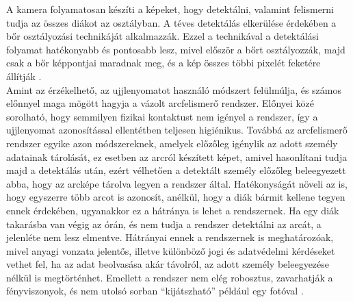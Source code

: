 \documentclass[12pt]{article}
\numberwithin{figure}{section}
\numberwithin{equation}{section}
\begin{document}
A kamera folyamatosan készíti a képeket, hogy detektálni, valamint felismerni tudja az összes diákot az osztályban. A téves detektálás elkerülése érdekében a bőr osztályozási technikáját alkalmazzák. Ezzel a technikával a detektálási folyamat hatékonyabb és pontosabb lesz, mivel először a bőrt osztályozzák, majd csak a bőr képpontjai maradnak meg, és a kép összes többi pixelét feketére állítják \cite{7}. \\
Amint az érzékelhető, az ujjlenyomatot használó módszert felülmúlja, és számos előnnyel maga mögött hagyja a vázolt arcfelismerő rendszer. Előnyei közé sorolható, hogy semmilyen fizikai kontaktust nem igényel a rendszer, így a ujjlenyomat azonosítással ellentétben teljesen higiénikus. Továbbá az arcfelismerő rendszer egyike azon módszereknek, amelyek előzőleg igénylik az adott személy adatainak tárolását, ez esetben az arcról készített képet, amivel hasonlítani tudja majd a detektálás után, ezért vélhetően a detektált személy előzőleg beleegyezett abba, hogy az arcképe tárolva legyen a rendszer által. Hatékonyságát növeli az is, hogy egyszerre több arcot is azonosít, anélkül, hogy a diák bármit kellene tegyen ennek érdekében, ugyanakkor ez a hátránya is lehet a rendszernek. Ha egy diák takarásba van végig az órán, és nem tudja a rendszer detektálni az arcát, a jelenléte nem lesz elmentve. 
Hátrányai ennek a rendszernek is meghatározóak, mivel anyagi vonzata jelentős, illetve különböző jogi és adatvédelmi kérdéseket vethet fel, ha az adat beolvasása akár távolról, az adott személy beleegyezése nélkül is megtörténhet. Emellett a rendszer nem elég robosztus, zavarhatják a fényviszonyok, és nem utolsó sorban \enquote{kijátszható} például egy fotóval \cite{8}.
\end{document}
